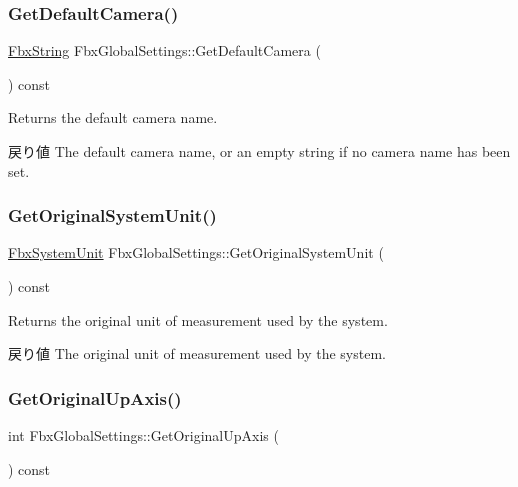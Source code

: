 \subsubsection{\texorpdfstring{Get\+Default\+Camera()}{GetDefaultCamera()}}
{\footnotesize\ttfamily \hyperlink{class_fbx_string}{Fbx\+String} Fbx\+Global\+Settings\+::\+Get\+Default\+Camera (\begin{DoxyParamCaption}{ }\end{DoxyParamCaption}) const}

Returns the default camera name. \begin{DoxyReturn}{戻り値}
The default camera name, or an empty string if no camera name has been set. 
\end{DoxyReturn}
\mbox{\label{class_fbx_global_settings_a5e52b2a7452a63b79b24aba5c7979e9a}} 
\subsubsection{\texorpdfstring{Get\+Original\+System\+Unit()}{GetOriginalSystemUnit()}}
{\footnotesize\ttfamily \hyperlink{class_fbx_system_unit}{Fbx\+System\+Unit} Fbx\+Global\+Settings\+::\+Get\+Original\+System\+Unit (\begin{DoxyParamCaption}{ }\end{DoxyParamCaption}) const}

Returns the original unit of measurement used by the system. \begin{DoxyReturn}{戻り値}
The original unit of measurement used by the system. 
\end{DoxyReturn}
\mbox{\label{class_fbx_global_settings_a6d55cf87bc48c0746c28b4d421db6381}} 
\subsubsection{\texorpdfstring{Get\+Original\+Up\+Axis()}{GetOriginalUpAxis()}}
{\footnotesize\ttfamily int Fbx\+Global\+Settings\+::\+Get\+Original\+Up\+Axis (\begin{DoxyParamCaption}{ }\end{DoxyParamCaption}) const}

